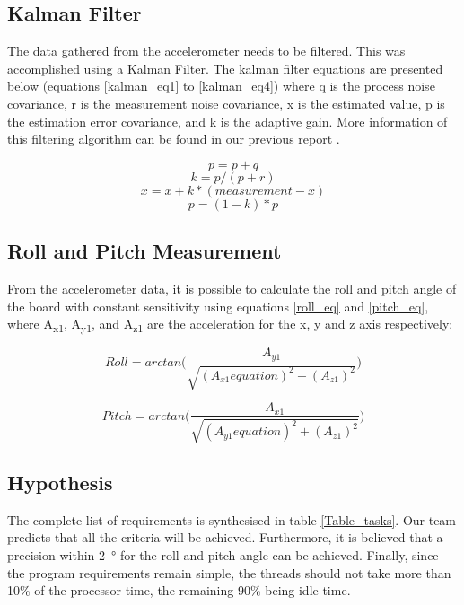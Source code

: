 \documentclass[12pt]{article}
\begin{document}
\subsection{Kalman Filter}
The data gathered from the accelerometer needs to be filtered. This was accomplished using a Kalman Filter. The kalman filter equations are presented below (equations \ref{kalman_eq1} to \ref{kalman_eq4}) where q is the process noise covariance, r is the measurement noise covariance, x is the estimated value, p is the estimation error covariance, and k is the adaptive gain. More information of this filtering algorithm can be found in our previous report \cite{Lab2report}.

\begin{equation}
\label{kalman_eq1}
p=p+q
\end{equation}
\begin{equation}
k=p/(p+r)
\end{equation}
\begin{equation}
x=x+k*(measurement-x)
\end{equation}
\begin{equation}
\label{kalman_eq4}
p=(1-k)*p
\end{equation}

\subsection{Roll and Pitch Measurement}
From the accelerometer data, it is possible to calculate the roll and pitch angle of the board with constant sensitivity using equations \ref{roll_eq} and \ref{pitch_eq}, where A\textsubscript{x1}, A\textsubscript{y1}, and A\textsubscript{z1} are the acceleration for the x, y and z axis respectively:

\begin{equation}
\label{roll_eq}
Roll = arctan \Bigg( \frac{A_{y1}}{\sqrt{(A_{x1}equation)^2+(A_{z1})^2}} \Bigg)
\end{equation}

\begin{equation}
\label{pitch_eq}
Pitch=arctan \Bigg( \frac{A_{x1}}{\sqrt{(A_{y1}equation)^2+(A_{z1})^2}} \Bigg)
\end{equation}

\subsection{Hypothesis}
The complete list of requirements is synthesised in table \ref{Table_tasks}. Our team predicts that all the criteria will be achieved. Furthermore, it is believed that a precision within \SI{2}{\degree} for the roll and pitch angle can be achieved. Finally, since the program requirements remain simple, the threads should not take more than 10\% of the processor time, the remaining 90\% being idle time.
\end{document}

